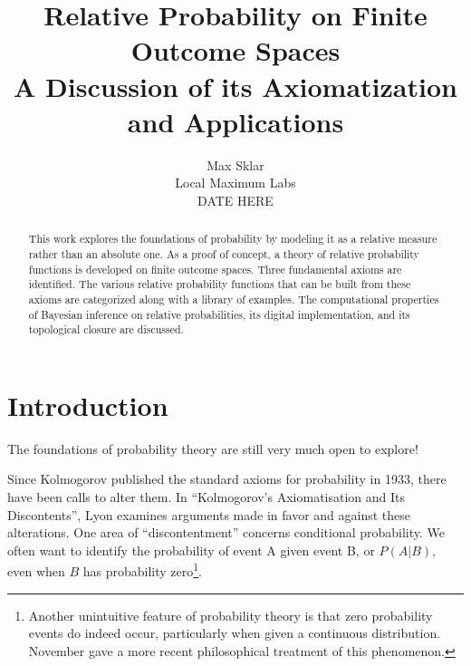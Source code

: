 \documentclass[twoside]{article}
\newcommand{\quotes}[1]{``#1''}
\theoremstyle{plain}%
\theoremstyle{definition}
\theoremstyle{remark}
\begin{document}
\parindent=0in
\parskip=12pt


\title{
  Relative Probability on Finite Outcome Spaces \\
  \large{
    A Discussion of its Axiomatization and Applications
  }
}

\author{Max Sklar\\ Local Maximum Labs \\ DATE HERE}
\date{}

\maketitle
\thispagestyle{empty}

\begin{abstract}
This work explores the foundations of probability by modeling it as a relative measure rather than an absolute one. As a proof of concept, a theory of relative probability functions is developed on finite outcome spaces. Three fundamental axioms are identified. The various relative probability functions that can be built from these axioms are categorized along with a library of examples. The computational properties of Bayesian inference on relative probabilities, its digital implementation, and its topological closure are discussed.
\end{abstract}

\tableofcontents
\newpage

\section{Introduction}

The foundations of probability theory are still very much open to explore!

Since Kolmogorov published the standard axioms for probability\cite{kolmogorov} in 1933, there have been calls to alter them. In \quotes{Kolmogorov's Axiomatisation and Its Discontents}, Lyon\cite{lyon} examines arguments made in favor and against these alterations. One area of \quotes{discontentment} concerns conditional probability. We often want to identify the probability of event A given event B, or \(P(A|B)\), even when \(B\) has probability zero\footnote{Another unintuitive feature of probability theory is that zero probability events do indeed occur, particularly when given a continuous distribution. November\cite{november} gave a more recent philosophical treatment of this phenomenon.}.
\end{document}
